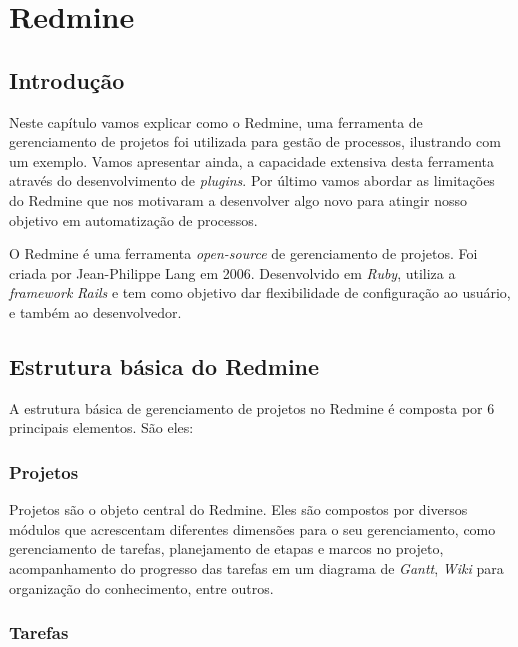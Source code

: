 \chapter{Redmine}\label{chp:redmine}

\section{Introdução}\label{sec:redmine-introducao}
Neste capítulo vamos explicar como o Redmine\cite{redmine}, uma ferramenta de gerenciamento de projetos foi utilizada para gestão de processos, ilustrando com um exemplo. Vamos apresentar ainda, a capacidade extensiva desta ferramenta através do desenvolvimento de \textit{plugins}. Por último vamos abordar as limitações do Redmine\cite{redmine} que nos motivaram a desenvolver algo novo para atingir nosso objetivo em automatização de processos.

O Redmine\cite{redmine} é uma ferramenta \textit{open-source} de gerenciamento de projetos. Foi criada por Jean-Philippe Lang em 2006. Desenvolvido em \textit{Ruby}, utiliza a \textit{framework} \textit{Rails} e tem como objetivo dar flexibilidade de configuração ao usuário, e também ao desenvolvedor.


\section{Estrutura básica do Redmine}\label{sec:redmine-estrutura_basica}

A estrutura básica de gerenciamento de projetos no Redmine é composta por 6 principais elementos. São eles:

\subsection{Projetos}\label{subsection:redmine-estrutura_basica-projeto}

Projetos são o objeto central do Redmine. Eles são compostos por diversos módulos que acrescentam diferentes dimensões para o seu gerenciamento, como gerenciamento de tarefas, planejamento de etapas e marcos no projeto, acompanhamento do progresso das tarefas em um diagrama de \textit{Gantt}, \textit{Wiki} para organização do conhecimento, entre outros. 

\subsection{Tarefas}\label{subsection:redmine-estrutura_basica-tarefa}

